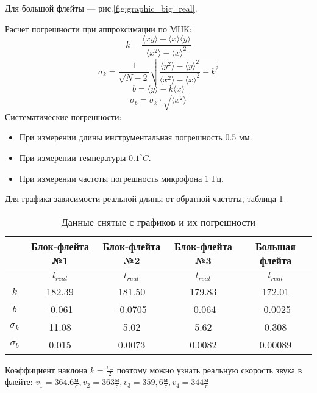 Для большой флейты --- рис.\ref{fig:graphic_big_real}.

Расчет погрешности при аппроксимации по МНК:
\[k = \frac{\langle xy\rangle-\langle x\rangle \langle y\rangle}{\langle x^2\rangle - \langle x\rangle^2}\]
\[\sigma_{k} = \frac{1}{\sqrt{N-2}}\sqrt{\frac{\langle y^2 \rangle - \langle y \rangle ^2}{\langle x^2 \rangle - \langle x \rangle ^2} - k^2}\]
\[b = \langle y \rangle - k \langle x\rangle \]
\[\sigma_{b} = \sigma_{k} \cdot \sqrt{\langle x^2 \rangle}\]
Систематические погрешности:
\begin{itemize}
    \item При измерении длины инструментальная погрешность 0.5 мм.
    \item При измерении температуры $0.1^\circ C$.
    \item При измерении частоты погрешность микрофона 1 Гц.
\end{itemize}
\newpage
Для графика зависимости реальной длины от обратной частоты, таблица \ref{tab:data_graphics}

\begin{table}[!ht]
\centering
\begin{tabular}{|c|c|c|c|c|}
\hline
             & Блок-флейта №1                   & Блок-флейта №2                    & Блок-флейта №3                   & Большая флейта                    \\ \hline
             & $l_{real}$                       & $l_{real}$                        & $l_{real}$                       & $l_{real}$                        \\ \hline
$k$          & 182.39    & 181.50   & 179.83  & 172.01   \\ \hline
$b$          & -0.061 & -0.0705 & -0.064 & -0.0025 \\ \hline
$\sigma_{k}$ & 11.08                            & 5.02                              & 5.62                             & 0.308                             \\ \hline
$\sigma_{b}$ & 0.015                            & 0.0073                            & 0.0082                           & 0.00089                           \\ \hline
\end{tabular}
    \caption{Данные снятые с графиков и их погрешности}
    \label{tab:data_graphics}
\end{table}

Коэффициент наклона $k = \frac{v_{\text{зв}}}{2}$ поэтому можно узнать реальную скорость звука в флейте: $v_{\text{1}} = 364.6 \frac{\text{м}}{\text{с}}, v_{\text{2}} = 363\frac{\text{м}}{\text{с}}, v_{\text{3}} = 359,6 \frac{\text{м}}{\text{с}},v_{\text{4}} = 344 \frac{\text{м}}{\text{с}}$

